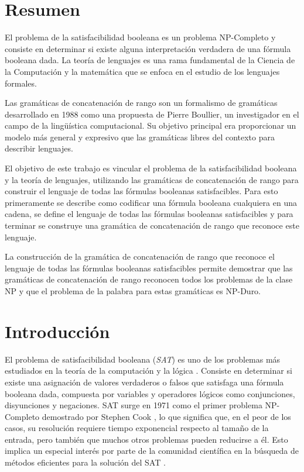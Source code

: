 \documentclass{article}
\begin{document}
\section{Resumen}

El problema de la satisfacibilidad booleana es un problema NP-Completo y consiste en determinar si existe
alguna interpretación verdadera de una fórmula booleana dada. La teoría de lenguajes es una rama fundamental de la Ciencia de la Computación y la matemática que se enfoca
en el estudio de los lenguajes formales.

Las gramáticas de concatenación de rango son un formalismo de gramáticas desarrollado
en 1988 como una propuesta de Pierre Boullier, un investigador en el campo de la lingüística computacional. Su objetivo principal era proporcionar un modelo más general y expresivo que las gramáticas libres del contexto para describir lenguajes.

El objetivo de este trabajo es vincular el problema de la satisfacibilidad
booleana y la teoría de lenguajes, utilizando las gramáticas de concatenación de rango
para construir el lenguaje de todas las fórmulas booleanas satisfacibles.
Para esto primeramente se describe como codificar una fórmula booleana cualquiera en una cadena, se define el lenguaje
de todas las fórmulas booleanas satisfacibles y para terminar se construye una gramática de concatenación de rango
que reconoce este lenguaje.

La construcción de la gramática de concatenación de rango que reconoce el lenguaje de todas
las fórmulas booleanas satisfacibles permite demostrar que las gramáticas de concatenación de rango reconocen
todos los problemas de la clase NP y que el problema de la palabra para estas gramáticas es NP-Duro.

\section{Introducción}

El problema de satisfacibilidad booleana (\textit{SAT}) \cite{authomataTheory} es uno de los problemas más estudiados en
la teoría de la computación y la lógica \cite{biere2021handbook}.  Consiste en determinar si existe una asignación
de valores verdaderos o falsos que satisfaga una fórmula booleana dada, compuesta por variables y operadores
lógicos como conjunciones, disyunciones y negaciones. SAT surge en 1971 como el primer problema NP-Completo
demostrado por Stephen Cook \cite{Cook1971}, lo que significa que, en el peor de los casos, su resolución
requiere tiempo exponencial respecto al tamaño de la entrada, pero también que muchos otros problemas pueden
reducirse a él. Esto implica un especial interés por parte de la comunidad científica en la búsqueda de
métodos eficientes para la solución del SAT \cite{biere2021handbook}.
\end{document}
